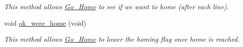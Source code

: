 \begin{DoxyCompactItemize}
\begin{DoxyCompactList}\small\item\em This method allows \hyperlink{classGo__Home}{Go\-\_\-\-Home} to see if we want to home (after each line). \end{DoxyCompactList}\item 
\hypertarget{classtask__lines_aef4c5d6e9c67d040a398c2d1791e5f19}{void \hyperlink{classtask__lines_aef4c5d6e9c67d040a398c2d1791e5f19}{ok\-\_\-were\-\_\-home} (void)}\label{classtask__lines_aef4c5d6e9c67d040a398c2d1791e5f19}

\begin{DoxyCompactList}\small\item\em This method allows \hyperlink{classGo__Home}{Go\-\_\-\-Home} to lower the homing flag once home is reached. \end{DoxyCompactList}\end{DoxyCompactItemize}
